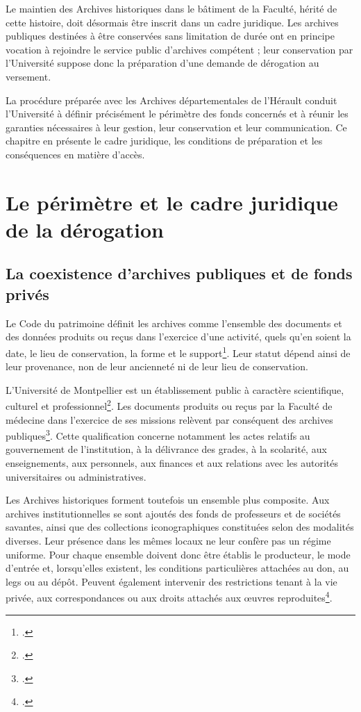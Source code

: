 Le maintien des Archives historiques dans le bâtiment de la Faculté, hérité de cette histoire, doit désormais être inscrit dans un cadre juridique. Les archives publiques destinées à être conservées sans limitation de durée ont en principe vocation à rejoindre le service public d'archives compétent ; leur conservation par l'Université suppose donc la préparation d'une demande de dérogation au versement.

La procédure préparée avec les Archives départementales de l'Hérault conduit l'Université à définir précisément le périmètre des fonds concernés et à réunir les garanties nécessaires à leur gestion, leur conservation et leur communication. Ce chapitre en présente le cadre juridique, les conditions de préparation et les conséquences en matière d'accès.

\section{Le périmètre et le cadre juridique de la dérogation}

\subsection{La coexistence d'archives publiques et de fonds privés}

Le Code du patrimoine définit les archives comme l'ensemble des documents et des données produits ou reçus dans l'exercice d'une activité, quels qu'en soient la date, le lieu de conservation, la forme et le support\footcite[art.~L.~211-1]{CodePatrimoine}. Leur statut dépend ainsi de leur provenance, non de leur ancienneté ni de leur lieu de conservation.

L'Université de Montpellier est un établissement public à caractère scientifique, culturel et professionnel\footcite[art.~L.~711-1]{CodeEducation}. Les documents produits ou reçus par la Faculté de médecine dans l'exercice de ses missions relèvent par conséquent des archives publiques\footcite[art.~L.~211-4]{CodePatrimoine}. Cette qualification concerne notamment les actes relatifs au gouvernement de l'institution, à la délivrance des grades, à la scolarité, aux enseignements, aux personnels, aux finances et aux relations avec les autorités universitaires ou administratives.

Les Archives historiques forment toutefois un ensemble plus composite. Aux archives institutionnelles se sont ajoutés des fonds de professeurs et de sociétés savantes, ainsi que des collections iconographiques constituées selon des modalités diverses. Leur présence dans les mêmes locaux ne leur confère pas un régime uniforme. Pour chaque ensemble doivent donc être établis le producteur, le mode d'entrée et, lorsqu'elles existent, les conditions particulières attachées au don, au legs ou au dépôt. Peuvent également intervenir des restrictions tenant à la vie privée, aux correspondances ou aux droits attachés aux œuvres reproduites\footcite{Foissey2017Juristes}.

